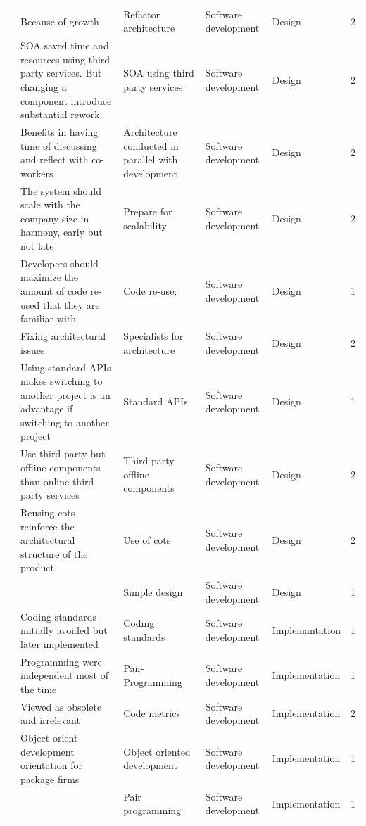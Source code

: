 \documentclass[final,5p,times,twocolumn]{elsarticle}
\begin{document}
\begin{center}
\begin{longtable}{|p{0.36in}|p{2.6in}|p{1.2in}|p{0.9in}|p{0.9in}|p{0.2in}|}
\cite{Ambler2002} & Because of growth & Refactor architecture & Software development & Design & 2 \\
\cite{Jansen2008} & SOA saved time and resources using third party services. But changing a component introduce substantial rework. & SOA using third party services & Software development & Design & 2 \\
\cite{Ambler2002} & Benefits in having time of discussing and reflect with co-workers & Architecture conducted in parallel with development & Software development & Design & 2 \\
\cite{Yoffie1999} & The system should scale with the company size in harmony, early but not late & Prepare for scalability & Software development & Design & 2 \\
\cite{Sutton2000} & Developers should maximize the amount of code re-used that they are familiar with & Code re-use; & Software development & Design & 1 \\
\cite{Ambler2002} & Fixing architectural issues & Specialists for architecture & Software development & Design & 2 \\
\cite{Wall2001} & Using standard APIs makes switching to another project is an advantage if switching to another project & Standard APIs & Software development & Design & 1 \\
\cite{Jansen2008} & Use third party but offline components than online third party services & Third party offline components & Software development & Design & 2 \\
\cite{Jansen2008} & Reusing cots reinforce the architectural structure of the product & Use of cots & Software development & Design & 2 \\
\cite{Silva2005} &       & Simple design & Software development & Design & 1 \\
\cite{Tingling2007} & Coding standards initially avoided  but later implemented & Coding standards & Software development & Implemantation & 1 \\
\cite{Tingling2007} & Programming were independent most of the time & Pair-Programming & Software development & Implementation & 1 \\
\cite{Zettel2001} & Viewed as obsolete and irrelevant & Code metrics & Software development & Implementation & 2 \\
\cite{Camel1994a} & Object orient development orientation for package firms & Object oriented development & Software development & Implementation & 1 \\
\cite{Silva2005} &       & Pair programming & Software development & Implementation & 1 \\

\end{longtable}
\end{center}
\end{document}
